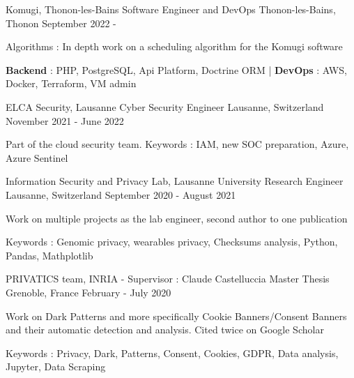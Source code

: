 


\begin{cventries}
	
	\cventry
	{Komugi, Thonon-les-Bains} %
	{Software Engineer and DevOps} %
	{Thonon-les-Bains, Thonon} %
	{September 2022 - } %
	{ %
		\begin{cvitems}
			\item {Algorithms : In depth work on a scheduling algorithm for the Komugi software}
			\item {\textbf{Backend} : PHP, PostgreSQL, Api Platform, Doctrine ORM | \textbf{DevOps} : AWS, Docker, Terraform, VM admin}
		\end{cvitems}
	}
	
	\cventry
	{ELCA Security, Lausanne} %
	{Cyber Security Engineer} %
	{Lausanne, Switzerland} %
	{November 2021 - June 2022} %
	{ %
		\begin{cvitems}
			\item {Part of the cloud security team. Keywords : IAM, new SOC preparation, Azure, Azure Sentinel}
		\end{cvitems}
	}
	
	\cventry
	{Information Security and Privacy Lab, Lausanne University} %
	{Research Engineer} %
	{Lausanne, Switzerland} %
	{September 2020 - August 2021} %
	{ %
		\begin{cvitems}
			\item {Work on multiple projects as the lab engineer, second author to one publication}
			\item {Keywords : Genomic privacy, wearables privacy, Checksums analysis, Python, Pandas, Mathplotlib}
		\end{cvitems}
	}
	
	\cventry
	{PRIVATICS team, INRIA - Supervisor : Claude Castelluccia} %
	{Master Thesis} %
	{Grenoble, France} %
	{February - July 2020} %
	{ %
		\begin{cvitems}
			\item {Work on Dark Patterns and more specifically Cookie Banners/Consent Banners and their automatic detection and analysis. Cited twice on Google Scholar}
			\item {Keywords : Privacy, Dark, Patterns, Consent, Cookies, GDPR, Data analysis, Jupyter, Data Scraping}
		\end{cvitems}
	}
	

\end{cventries}
